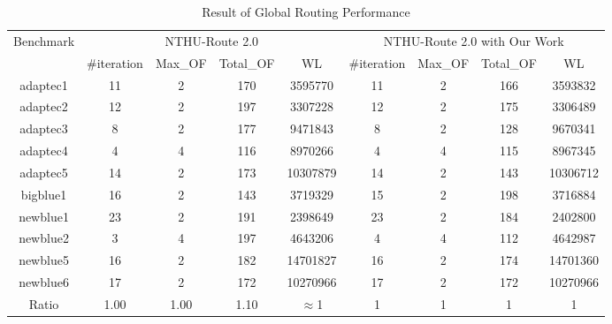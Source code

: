\begin{table*}[htbp]
\caption{Result of Global Routing Performance}
\begin{center}
\begin{tabular}{|c|c|c|c|c|c|c|c|c|}
\hline
\multirow{2}{*}{Benchmark} & \multicolumn{4}{c|}{NTHU-Route 2.0}          & \multicolumn{4}{c|}{NTHU-Route 2.0 with Our Work} \\ \cline{2-9} 
                           & \#iteration & Max\_OF & Total\_OF & WL       & \#iteration   & Max\_OF  & Total\_OF  & WL        \\ \hline
adaptec1                   & 11          & 2       & 170       & 3595770  & 11            & 2        & 166        & 3593832   \\ \hline
adaptec2                   & 12          & 2       & 197       & 3307228  & 12            & 2        & 175        & 3306489   \\ \hline
adaptec3                   & 8           & 2       & 177       & 9471843  & 8             & 2        & 128        & 9670341   \\ \hline
adaptec4                   & 4           & 4       & 116       & 8970266  & 4             & 4        & 115        & 8967345   \\ \hline
adaptec5                   & 14          & 2       & 173       & 10307879 & 14            & 2        & 143        & 10306712  \\ \hline
bigblue1                   & 16          & 2       & 143       & 3719329  & 15            & 2        & 198        & 3716884   \\ \hline
newblue1                   & 23          & 2       & 191       & 2398649  & 23            & 2        & 184        & 2402800   \\ \hline
newblue2                   & 3           & 4       & 197       & 4643206  & 4             & 4        & 112        & 4642987   \\ \hline
newblue5                   & 16          & 2       & 182       & 14701827 & 16            & 2        & 174        & 14701360  \\ \hline
newblue6                   & 17          & 2       & 172       & 10270966 & 17            & 2        & 172        & 10270966  \\ \hline
Ratio                      & 1.00        & 1.00    & 1.10      & $\approx$1 & 1           & 1        & 1            & 1  \\ \hline
\end{tabular}
\label{tab:gr}
\end{center}
\end{table*}